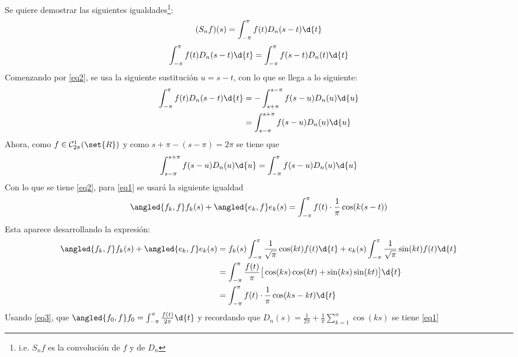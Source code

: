 \documentclass{homework}
\begin{document}
\begin{sol}[1.b]
    Se quiere demostrar las siguientes igualdades\footnote{i.e. \(S_n f\) es la convolución de \(f\) y de \(D_n\)}:
    \begin{equation}
        (S_n f)(s)=\int_{-\pi}^\pi f(t)D_n(s-t)\d{t}\label{eq1}
    \end{equation}
    \begin{equation}
        \int_{-\pi}^\pi f(t)D_n(s-t)\d{t}=\int_{-\pi}^\pi f(s-t)D_n(t)\d{t}\label{eq2}
    \end{equation}
    Comenzando por \eqref{eq2}, se usa la siguiente sustitución \(u=s-t\), con lo que se llega a lo siguiente:
    \begin{align*}
        \int_{-\pi}^\pi f(t)D_n(s-t)\d{t}&=-\int_{s+\pi}^{s-\pi}f(s-u)D_n(u)\d{u}\\
        &=\int_{s-\pi}^{s+\pi}f(s-u)D_n(u)\d{u}
    \end{align*}
    Ahora, como \(f\in\mathcal{C}_{2\pi}^1(\set{R})\) y como \(s+\pi-(s-\pi)=2\pi\) se tiene que
    \begin{equation*}
        \int_{s-\pi}^{s+\pi}f(s-u)D_n(u)\d{u}=\int_{-\pi}^{\pi}f(s-u)D_n(u)\d{u}
    \end{equation*}
    Con lo que se tiene \eqref{eq2}, para \eqref{eq1} se usará la siguiente igualdad
    \begin{equation}
        \angled{f_k,f}f_k(s)+\angled{e_k,f}e_k(s)=\int_{-\pi}^\pi f(t)\cdot\frac1\pi\cos(k(s-t))\label{eq3}
    \end{equation}
    Esta aparece desarrollando la expresión:
    \begin{align*}
        \angled{f_k,f}f_k(s)+\angled{e_k,f}e_k(s)&=f_k(s)\int_{-\pi}^\pi\frac1{\sqrt{\pi}}\cos(kt)f(t)\d{t}+e_k(s)\int_{-\pi}^\pi\frac1{\sqrt{\pi}}\sin(kt)f(t)\d{t}\\
        &=\int_{-\pi}^\pi \frac{f(t)}\pi\big[\cos(ks)\cos(kt)+\sin(ks)\sin(kt)\big]\d{t}\\
        &=\int_{-\pi}^\pi f(t)\cdot\frac1\pi\cos(ks-kt)\d{t}
    \end{align*}
    Usando \eqref{eq3}, que \(\angled{f_0,f}f_0=\int_{-\pi}^\pi \frac{f(t)}{2\pi}\d{t}\) y recordando que \(D_n(s)=\frac1{2\pi}+\frac1\pi\sum_{k=1}^n\cos(ks)\) se tiene \eqref{eq1}
\end{sol}
\end{document}
